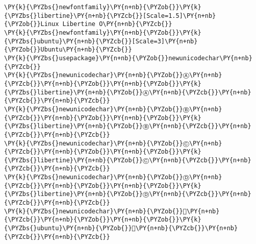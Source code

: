 \begin{Verbatim}[commandchars=\\\{\}]
\PY{k}{\PYZbs{}newfontfamily}\PY{n+nb}{\PYZob{}}\PY{k}{\PYZbs{}libertine}\PY{n+nb}{\PYZcb{}}[Scale=1.5]\PY{n+nb}{\PYZob{}}Linux Libertine O\PY{n+nb}{\PYZcb{}}
\PY{k}{\PYZbs{}newfontfamily}\PY{n+nb}{\PYZob{}}\PY{k}{\PYZbs{}ubuntu}\PY{n+nb}{\PYZcb{}}[Scale=3]\PY{n+nb}{\PYZob{}}Ubuntu\PY{n+nb}{\PYZcb{}}
\PY{k}{\PYZbs{}usepackage}\PY{n+nb}{\PYZob{}}newunicodechar\PY{n+nb}{\PYZcb{}}
\PY{k}{\PYZbs{}newunicodechar}\PY{n+nb}{\PYZob{}}Ⓐ\PY{n+nb}{\PYZcb{}}\PY{n+nb}{\PYZob{}}\PY{n+nb}{\PYZob{}}\PY{k}{\PYZbs{}libertine}\PY{n+nb}{\PYZob{}}Ⓐ\PY{n+nb}{\PYZcb{}}\PY{n+nb}{\PYZcb{}}\PY{n+nb}{\PYZcb{}}
\PY{k}{\PYZbs{}newunicodechar}\PY{n+nb}{\PYZob{}}Ⓑ\PY{n+nb}{\PYZcb{}}\PY{n+nb}{\PYZob{}}\PY{n+nb}{\PYZob{}}\PY{k}{\PYZbs{}libertine}\PY{n+nb}{\PYZob{}}Ⓑ\PY{n+nb}{\PYZcb{}}\PY{n+nb}{\PYZcb{}}\PY{n+nb}{\PYZcb{}}
\PY{k}{\PYZbs{}newunicodechar}\PY{n+nb}{\PYZob{}}Ⓒ\PY{n+nb}{\PYZcb{}}\PY{n+nb}{\PYZob{}}\PY{n+nb}{\PYZob{}}\PY{k}{\PYZbs{}libertine}\PY{n+nb}{\PYZob{}}Ⓒ\PY{n+nb}{\PYZcb{}}\PY{n+nb}{\PYZcb{}}\PY{n+nb}{\PYZcb{}}
\PY{k}{\PYZbs{}newunicodechar}\PY{n+nb}{\PYZob{}}Ⓓ\PY{n+nb}{\PYZcb{}}\PY{n+nb}{\PYZob{}}\PY{n+nb}{\PYZob{}}\PY{k}{\PYZbs{}libertine}\PY{n+nb}{\PYZob{}}Ⓓ\PY{n+nb}{\PYZcb{}}\PY{n+nb}{\PYZcb{}}\PY{n+nb}{\PYZcb{}}
\PY{k}{\PYZbs{}newunicodechar}\PY{n+nb}{\PYZob{}}\PY{n+nb}{\PYZcb{}}\PY{n+nb}{\PYZob{}}\PY{n+nb}{\PYZob{}}\PY{k}{\PYZbs{}ubuntu}\PY{n+nb}{\PYZob{}}\PY{n+nb}{\PYZcb{}}\PY{n+nb}{\PYZcb{}}\PY{n+nb}{\PYZcb{}}
\end{Verbatim}
